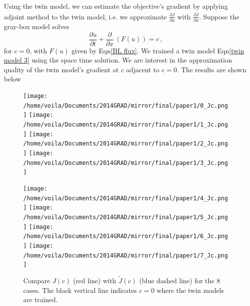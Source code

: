 \documentclass[a4paper,onecolumn]{article}
\theoremstyle{remark}
\begin{document}
\noindent Using the twin model, we can estimate the objective's gradient by applying
adjoint method to the twin model, i.e. we approximate
$\frac{\partial J}{\partial u}$ with $\frac{\partial \tilde{J}}{\partial u}$.
Suppose the gray-box model solves
\begin{equation}
    \frac{\partial u}{\partial t} + \frac{\partial}{\partial x}\,
    \left(F(u)\right) = c\,,
\end{equation}
for $c=0$, with $F(u)$ given by Eqn\eqref{BL flux}. We trained a twin model
Eqn\eqref{twin model 3} using the space time solution. We are interest in
the approximation quality of the twin model's gradient at $c$ adjacent to $c=0$.
The results are shown below
\begin{figure}[H]\begin{center}
    \texttt{[image: /home/voila/Documents/2014GRAD/mirror/final/paper1/0\_Jc.png]}
    \texttt{[image: /home/voila/Documents/2014GRAD/mirror/final/paper1/1\_Jc.png]}
    \texttt{[image: /home/voila/Documents/2014GRAD/mirror/final/paper1/2\_Jc.png]}
    \texttt{[image: /home/voila/Documents/2014GRAD/mirror/final/paper1/3\_Jc.png]}
\end{center}\end{figure}
\vspace{-1.3cm}
\begin{figure}[H]\begin{center}
    \texttt{[image: /home/voila/Documents/2014GRAD/mirror/final/paper1/4\_Jc.png]}
    \texttt{[image: /home/voila/Documents/2014GRAD/mirror/final/paper1/5\_Jc.png]}
    \texttt{[image: /home/voila/Documents/2014GRAD/mirror/final/paper1/6\_Jc.png]}
    \texttt{[image: /home/voila/Documents/2014GRAD/mirror/final/paper1/7\_Jc.png]}
    \caption{Compare $J(c)$ (red line) with $\tilde{J}(c)$ (blue dashed line) for the 8 cases. 
    The black vertical line indicates
    $c=0$ where the twin models are trained.}
\end{center}\end{figure}
\end{document}
